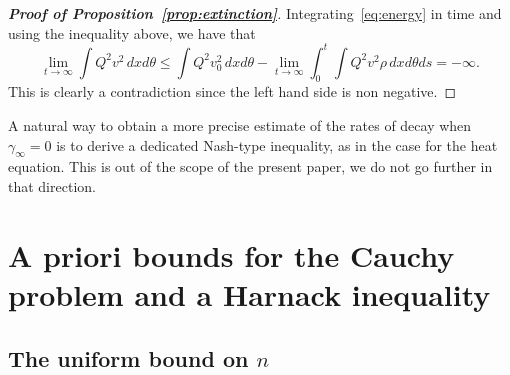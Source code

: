 \documentclass[11pt]{article}    %
\begin{document}
\begin{proof}[{\bf Proof of  Proposition~\ref{prop:extinction}}]
Integrating~\eqref{eq:energy} in time and using the inequality above, we have that
\[
\lim_{t\to\infty}\int Q^2 v^2\, dxd\theta
		\leq \int Q^2 v_0^2\, dxd\theta
		- \lim_{t\to\infty}\int_0^t \int Q^2 v^2 \rho\, dxd\theta ds
		= -\infty.
\]
This is clearly a contradiction since the left hand side is non negative.
\end{proof}

A natural way to obtain a more precise estimate of the rates of decay when $\gamma_\infty = 0$ is to derive a dedicated Nash-type inequality, as in the case for the heat equation.  %
This is out of the scope of the present paper, we do not go further in that direction.  
 
\section{A priori bounds for the Cauchy problem and a Harnack inequality}\label{sec:apriori}

\subsection{The uniform bound on $n$}
\end{document}
